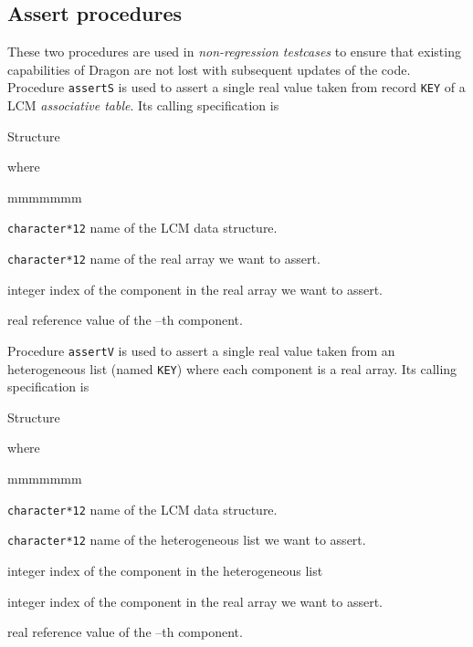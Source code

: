 \subsection{Assert procedures}\label{sect:assert}

These two procedures are used in  {\sl non-regression testcases}
to ensure that existing capabilities of Dragon are not lost with subsequent
updates of the code. Procedure {\tt assertS} is used to assert a single real value taken
from record {\tt KEY} of a LCM {\sl associative table}. Its calling
specification is

\begin{DataStructure}{Structure }
  \moc{::}    \moc{;} 
\end{DataStructure}
\noindent where 
\begin{ListeDeDescription}{mmmmmmm}

\item[\dusa{LCMNAM}] {\tt character*12} name of the LCM data structure.

\item[\dusa{KEY}] {\tt character*12} name of the real array we want to assert.

\item[\dusa{ipos}] integer index of the component in the real array we want to assert.

\item[\dusa{values}] real reference value of the --th component.

\end{ListeDeDescription}

Procedure {\tt assertV} is used to assert a single real value taken from an heterogeneous list
(named {\tt KEY}) where each component is a real array. Its calling
specification is

\begin{DataStructure}{Structure }
  \moc{::}     \moc{;} 
\end{DataStructure}
\noindent where 
\begin{ListeDeDescription}{mmmmmmm}

\item[\dusa{LCMNAM}] {\tt character*12} name of the LCM data structure.

\item[\dusa{KEY}] {\tt character*12} name of the heterogeneous list we want to assert.

\item[\dusa{ipos}] integer index of the component in the heterogeneous list

\item[\dusa{ipos}] integer index of the component in the real array we want to assert.

\item[\dusa{values}] real reference value of the --th component.

\end{ListeDeDescription}


